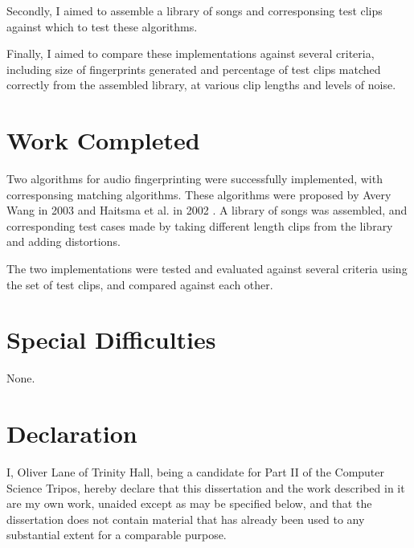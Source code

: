 \documentclass[12pt,a4paper,twoside,openright]{report}
\begin{document}
Secondly, I aimed to assemble a library of songs and corresponsing test clips against which to test these algorithms.

Finally, I aimed to compare these implementations against several criteria, including size of fingerprints generated and percentage of test clips matched correctly from the assembled library, at various clip lengths and levels of noise.

\section*{Work Completed}

Two algorithms for audio fingerprinting were successfully implemented, with corresponsing matching algorithms. These algorithms were proposed by Avery Wang in 2003 \cite{Wang03} and Haitsma et al. in 2002 \cite{Haitsma02}. A library of songs was assembled, and corresponding test cases made by taking different length clips from the library and adding distortions.

The two implementations were tested and evaluated against several criteria using the set of test clips, and compared against each other.

\section*{Special Difficulties}

None.

 
\newpage
\section*{Declaration}

I, Oliver Lane of Trinity Hall, being a candidate for Part II of the Computer Science Tripos, hereby declare that this dissertation and the work described in  it are my own work, unaided except as may be specified below, and that the  dissertation does not contain material that has already been used to any  substantial extent for a comparable purpose.

\bigskip
{}

\medskip
{}

\tableofcontents




\pagestyle{headings}
\end{document}
